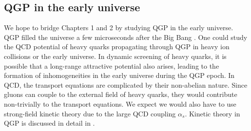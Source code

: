 \subsection{QGP in the early universe}
We hope to bridge Chapters 1 and 2 by studying QGP in the early universe. QGP filled the universe a few microseconds after the Big Bang \cite{rafelski2013connecting}. One could study the QCD potential of heavy quarks propagating through QGP in heavy ion collisions or the early universe. In dynamic screening of heavy quarks, it is possible that a long-range attractive potential also arises, leading to the formation of inhomogeneities in the early universe during the QGP epoch. In QCD, the transport equations are complicated by their non-abelian nature. Since gluons can couple to the external field of heavy quarks, they would contribute non-trivially to the transport equations. We expect we would also have to use strong-field kinetic theory due to the large QCD coupling $\alpha_s$. Kinetic theory in QGP is discussed in detail in \cite{MROWCZYNSKI20171}.
